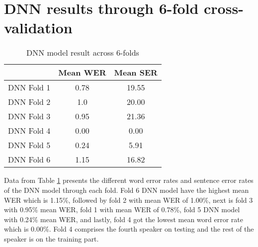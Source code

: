 \section{DNN results through 6-fold cross-validation}
\begin{table}[htb]   %
	\setlength{\extrarowheight}{0.3em}
	\centering
	\begin{tabular}{|p{1in}|c|c|} \hline
		\centering  & Mean WER & Mean SER \\ \hline
		DNN Fold 1 & 0.78 & 19.55 \\ 
		DNN Fold 2 & 1.0 & 20.00 \\ 
		DNN Fold 3 & 0.95 & 21.36  \\ 
		DNN Fold 4 & 0.00 & 0.00 \\ 
		DNN Fold 5 & 0.24 & 5.91 \\ 
            DNN Fold 6 & 1.15 & 16.82 \\ \hline
	\end{tabular}
        \caption{DNN model result across 6-folds} 
	\label{tab:mean_wer_dnn}
\end{table}

Data from Table \ref{tab:mean_wer_dnn} presents the different word error rates and sentence error rates of the DNN model through each fold. Fold 6 DNN model have the highest mean WER which is 1.15\%, followed by fold 2 with mean WER of 1.00\%, next is fold 3 with 0.95\% mean WER, fold 1 with mean WER of 0.78\%, fold 5 DNN model with 0.24\% mean WER, and lastly, fold 4 got the lowest mean word error rate which is 0.00\%. Fold 4 comprises the fourth speaker on testing and the rest of the speaker is on the training part.

